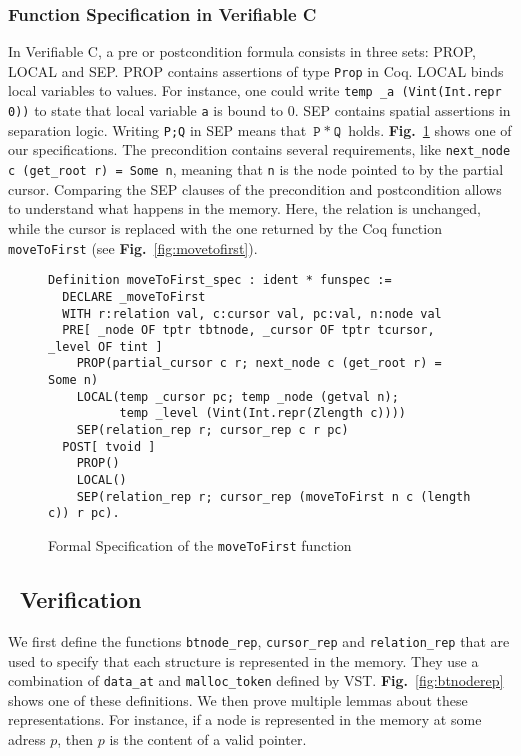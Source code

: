 \subsubsection{Function Specification in Verifiable C}
In Verifiable C, a pre or postcondition formula consists in three sets: PROP, LOCAL and SEP.
PROP contains assertions of type \texttt{Prop} in Coq.
LOCAL binds local variables to values. For instance, one could write \texttt{temp \_a (Vint(Int.repr 0))} to state that local variable \texttt{a} is bound to 0.
SEP contains spatial assertions in separation logic. Writing \texttt{P;Q} in SEP means that $\texttt{P}~*~\texttt{Q}$ holds.
\textbf{Fig.}~\ref{fig:spec} shows one of our specifications.
The precondition contains several requirements, like \texttt{next\_node c (get\_root r) = Some n}, meaning that \texttt{n} is the node pointed to by the partial cursor.
Comparing the SEP clauses of the precondition and postcondition allows to understand what happens in the memory.
Here, the relation is unchanged, while the cursor is replaced with the one returned by the Coq function \texttt{moveToFirst} (see \textbf{Fig.}~\ref{fig:movetofirst}).

\begin{figure}
\begin{lstlisting}[language=Coq]
Definition moveToFirst_spec : ident * funspec :=
  DECLARE _moveToFirst
  WITH r:relation val, c:cursor val, pc:val, n:node val
  PRE[ _node OF tptr tbtnode, _cursor OF tptr tcursor, _level OF tint ]
    PROP(partial_cursor c r; next_node c (get_root r) = Some n)
    LOCAL(temp _cursor pc; temp _node (getval n);
          temp _level (Vint(Int.repr(Zlength c))))
    SEP(relation_rep r; cursor_rep c r pc)
  POST[ tvoid ]
    PROP()
    LOCAL()
    SEP(relation_rep r; cursor_rep (moveToFirst n c (length c)) r pc).
\end{lstlisting}
\label{fig:spec}
\caption{Formal Specification of the \texttt{moveToFirst} function}
\end{figure}



\subsection{\btrees\ Verification}
We first define the functions \texttt{btnode\_rep}, \texttt{cursor\_rep} and \texttt{relation\_rep} that are used to specify that each structure is represented in the memory.
They use a combination of \texttt{data\_at} and \texttt{malloc\_token} defined by VST.
\textbf{Fig.}~\ref{fig:btnoderep} shows one of these definitions.
We then prove multiple lemmas about these representations. For instance, if a node is represented in the memory at some adress $p$, then $p$ is the content of a valid pointer.


